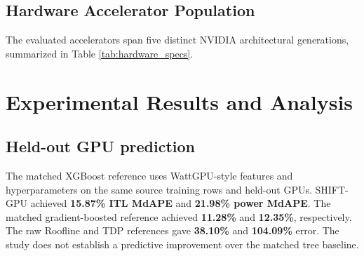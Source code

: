 \documentclass[preprint,12pt]{elsarticle}
\begin{document}
\subsection{Hardware Accelerator Population}
The evaluated accelerators span five distinct NVIDIA architectural generations, summarized in Table \ref{tab:hardware_specs}.

\begin{table}[h]
\centering
\caption{Microarchitectural specifications of evaluated server-grade GPU hardware population.}
\label{tab:hardware_specs}
\end{table}

\section{Experimental Results and
Analysis}\label{experimental-results-and-analysis}

\subsection{Held-out GPU prediction}\label{held-out-gpu-prediction}

The matched XGBoost reference uses WattGPU-style features and
hyperparameters on the same source training rows and held-out GPUs.
SHIFT-GPU achieved \textbf{15.87\% ITL MdAPE} and \textbf{21.98\% power
MdAPE}. The matched gradient-boosted reference achieved \textbf{11.28\%}
and \textbf{12.35\%}, respectively. The raw Roofline and TDP references
gave \textbf{38.10\%} and \textbf{104.09\%} error. The study does not
establish a predictive improvement over the matched tree baseline.
\end{document}
